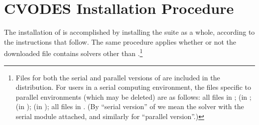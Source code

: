 \chapter{CVODES Installation Procedure}\label{c:install}

The installation of {\cvodes} is accomplished by installing the
{\sundials} suite as a whole, according to the instructions that
follow.   The same procedure applies whether or not the downloaded
file contains solvers other than {\cvodes}.\footnote{Files for both the
serial and parallel versions of {\cvodes} are included in the distribution.
For users in a serial computing environment, the files specific to parallel
environments (which may be deleted) are as follows:
all files in ;
 (in ;
 (in );
 (in ); 
all files in .
(By ``serial version'' of {\cvodes} we mean the {\cvodes} solver with the
serial {\nvector} module attached, and similarly for ``parallel version''.)}

